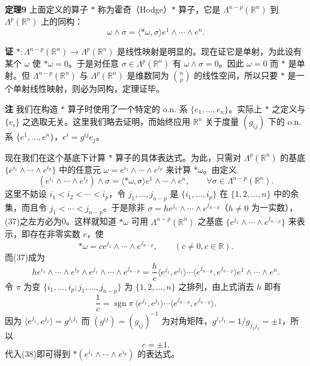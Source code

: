 \noindent\textbf{定理9}
上面定义的算子 $*$ 称为霍奇（Hodge）$*$ 算子，它是 $\Lambda^{n-p}(\mathbb R^n)$ 到 $\Lambda^p(\mathbb R^n)$ 上的同构：
\begin{equation}
 \omega\wedge\sigma=\langle*\omega,\sigma\rangle e^1\wedge\cdots\wedge e^n.
 \tag{36}
\end{equation}

\noindent\textbf{证}
$*: \Lambda^{n-p}(\mathbb R^n)\to\Lambda^p(\mathbb R^n)$ 是线性映射是明显的。现在证它是单射，为此设有某个 $\omega$ 使 $*\omega=0$。于是对任意 $\sigma\in\Lambda^p(\mathbb R^n)$ 有 $\omega\wedge\sigma=0$。因此 $\omega=0$ 而 $*$ 是单射。但 $\Lambda^{n-p}(\mathbb R^n)$ 与 $\Lambda^p(\mathbb R^n)$ 是维数同为 $\binom np$ 的线性空间，所以只要 $*$ 是一个单射线性映射，则必为同构，定理证毕。

\noindent\textbf{注}
我们在构造 $*$ 算子时使用了一个特定的 o.n. 系 $\{e_1,\ldots,e_n\}$。实际上 $*$ 之定义与 $\{e_i\}$ 之选取无关。这里我们略去证明，而始终应用 $\mathbb R^n$ 关于度量 $(g_{ij})$ 下的 o.n. 系 $\{e^1,\ldots,e^n\}$，$e^i=g^{ij}e_j$。

现在我们在这个基底下计算 $*$ 算子的具体表达式。为此，只需对 $\Lambda^p(\mathbb R^n)$ 的基底 $\{e^{i_1}\wedge\cdots\wedge e^{i_p}\}$ 中的任意元 $\omega=e^{i_1}\wedge\cdots\wedge e^{i_p}$ 来计算 $*\omega$。由定义
\begin{equation}
 (e^{i_1}\wedge\cdots\wedge e^{i_p})\wedge\sigma
 =\langle*\omega,\sigma\rangle e^1\wedge\cdots\wedge e^n,
 \qquad\forall\sigma\in\Lambda^{n-p}(\mathbb R^n).
 \tag{37}
\end{equation}
这里不妨设 $i_1<i_2<\cdots<i_p$，令 $j_1,\ldots,j_{n-p}$ 是 $\{i_1,\ldots,i_p\}$ 在 $\{1,2,\ldots,n\}$ 中的余集，而且令 $j_1<\cdots<j_{n-p}$。于是除非 $\sigma=he^{j_1}\wedge\cdots\wedge e^{j_{n-p}}$（$h\ne0$ 为一实数），(37)之左方必为0。这样就知道 $*\omega$ 可用 $\Lambda^{n-p}(\mathbb R^n)$ 之基底 $\{e^{j_1}\wedge\cdots\wedge e^{j_{n-p}}\}$ 来表示，即存在非零实数 $c$，使
\begin{equation}
 *\omega=ce^{j_1}\wedge\cdots\wedge e^{j_{n-p}},\qquad(c\ne0,c\in\mathbb R).
 \tag{38}
\end{equation}
而(37)成为
\[
 he^{i_1}\wedge\cdots\wedge e^{i_p}\wedge e^{j_1}\wedge\cdots\wedge e^{j_{n-p}}
 =\frac hc\langle e^{j_1},e^{j_1}\rangle\cdots\langle e^{j_{n-p}},e^{j_{n-p}}\rangle e^1\wedge\cdots\wedge e^n.
\]
令 $\pi$ 为变 $\{i_1,\ldots,i_p;j_1,\ldots,j_{n-p}\}$ 为 $\{1,2,\ldots,n\}$ 之排列，由上式消去 $h$ 即有
\[
 \frac1c=\operatorname{sgn}\pi\,\langle e^{j_1},e^{j_1}\rangle\cdots\langle e^{j_{n-p}},e^{j_{n-p}}\rangle.
\]
因为 $\langle e^{j_1},e^{j_1}\rangle=g^{j_1j_1}$ 而 $(g^{ij})=(g_{ij})^{-1}$ 为对角矩阵，$g^{j_1j_1}=1/g_{j_1j_1}=\pm1$，所以
\[
 c=\pm1.
\]
代入(38)即可得到 $*(e^{i_1}\wedge\cdots\wedge e^{i_p})$ 的表达式。

